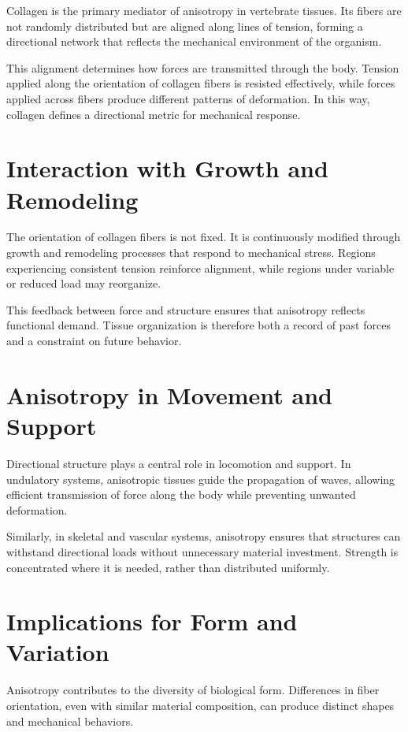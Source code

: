 \documentclass[11pt,oneside]{book}
\begin{document}
Collagen is the primary mediator of anisotropy in vertebrate tissues. Its fibers are not randomly distributed but are aligned along lines of tension, forming a directional network that reflects the mechanical environment of the organism.

This alignment determines how forces are transmitted through the body. Tension applied along the orientation of collagen fibers is resisted effectively, while forces applied across fibers produce different patterns of deformation. In this way, collagen defines a directional metric for mechanical response.

\section{Interaction with Growth and Remodeling}

The orientation of collagen fibers is not fixed. It is continuously modified through growth and remodeling processes that respond to mechanical stress. Regions experiencing consistent tension reinforce alignment, while regions under variable or reduced load may reorganize.

This feedback between force and structure ensures that anisotropy reflects functional demand. Tissue organization is therefore both a record of past forces and a constraint on future behavior.

\section{Anisotropy in Movement and Support}

Directional structure plays a central role in locomotion and support. In undulatory systems, anisotropic tissues guide the propagation of waves, allowing efficient transmission of force along the body while preventing unwanted deformation.

Similarly, in skeletal and vascular systems, anisotropy ensures that structures can withstand directional loads without unnecessary material investment. Strength is concentrated where it is needed, rather than distributed uniformly.

\section{Implications for Form and Variation}

Anisotropy contributes to the diversity of biological form. Differences in fiber orientation, even with similar material composition, can produce distinct shapes and mechanical behaviors.
\end{document}
